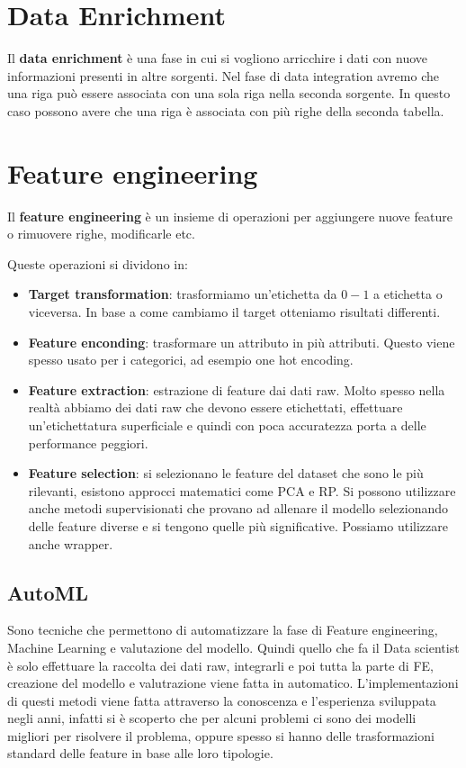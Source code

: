 \section{Data Enrichment}
Il \textbf{data enrichment} è una fase in cui si vogliono arricchire i dati con
nuove informazioni presenti in altre sorgenti. Nel fase di data integration
avremo che una riga può essere associata con una sola riga nella seconda sorgente.
In questo caso possono avere che una riga è associata con più righe della seconda
tabella.

\section{Feature engineering}
Il \textbf{feature engineering} è un insieme di operazioni per aggiungere nuove
feature o rimuovere righe, modificarle etc.

Queste operazioni si dividono in:
\begin{itemize}
      \item \textbf{Target transformation}: trasformiamo un'etichetta da $0-1$ a
            etichetta o viceversa. In base a come cambiamo il target otteniamo
            risultati differenti.
      \item \textbf{Feature enconding}: trasformare un attributo in più attributi.
            Questo viene spesso usato per i categorici, ad esempio one hot encoding.
      \item \textbf{Feature extraction}: estrazione di feature dai dati raw.
      Molto spesso nella realtà abbiamo dei dati raw che devono essere etichettati,
      effettuare un'etichettatura superficiale e quindi con poca accuratezza porta a 
      delle performance peggiori.
      \item \textbf{Feature selection}: si selezionano le feature del dataset 
      che sono le più rilevanti, esistono approcci matematici come PCA e RP. Si possono 
      utilizzare anche metodi supervisionati che provano ad allenare il modello 
      selezionando delle feature diverse e si tengono quelle più significative. 
      Possiamo utilizzare anche wrapper.
\end{itemize}

\subsection{AutoML}
Sono tecniche che permettono di automatizzare la fase di Feature engineering,
Machine Learning e valutazione del modello. Quindi quello che fa il Data scientist
è solo effettuare la raccolta dei dati raw, integrarli e poi tutta la parte di 
FE, creazione del modello e valutrazione viene fatta in automatico. L'implementazioni 
di questi metodi viene fatta attraverso la conoscenza e l'esperienza sviluppata 
negli anni, infatti si è scoperto che per alcuni problemi ci sono dei modelli migliori
per risolvere il problema, oppure spesso si hanno delle trasformazioni standard 
delle feature in base alle loro tipologie.

